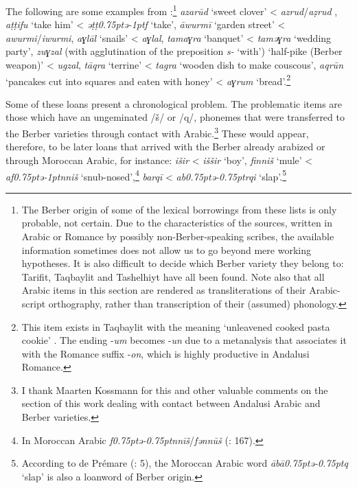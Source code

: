 \documentclass[output=paper,modfonts,nonflat]{langsci/langscibook}
\begin{document}
The following are some examples from \citet{CorrientePereiraVicente2017}:\footnote{The Berber origin of some of the lexical borrowings from these lists is only probable, not certain. Due to the characteristics of the sources, written in Arabic or Romance by possibly non-Berber-speaking scribes, the available information sometimes does not allow us to go beyond mere working hypotheses. It is also difficult to decide which Berber variety they belong to: Tarifit, Taqbaylit and Tashelhiyt have all been found. Note also that all Arabic items in this section are rendered as transliterations of their Arabic-script orthography, rather than transcription of their (assumed) phonology.} \textit{azarūd} ‘sweet clover’ < \textit{azrud}/\textit{aẓrud} , \textit{aṭṭifu} ‘take him’ < \textit{ǝṭṭ\kern 0.75ptǝ\kern -1ptf} ‘take’, \textit{āwurmī} ‘garden street’ < \textit{awurmi}/\textit{iwurmi}, \textit{aɣlāl} ‘snails’ < \textit{aɣlal}, \textit{tamaɣra} ‘banquet’ < \textit{tamǝɣra} `wedding party', \textit{zuɣzal} ({with agglutination of the preposition} \textit{s-} ‘with’) ‘half-pike (Berber weapon)’ < \textit{ugzal}, \textit{tāqra} `terrine' < \textit{tagra} `wooden dish to make couscous’, \textit{aqrūn} ‘pancakes cut into squares and eaten with honey’ < \textit{aɣrum} ‘bread’.\footnote{This item exists in Taqbaylit with the meaning ‘unleavened cooked pasta cookie’ \citep{Dallet1982}. The ending -\textit{um} becomes -\textit{un} due to a metanalysis that associates it with the Romance suffix -\textit{on}, which is highly productive in Andalusi Romance.} 

Some of these loans present a chronological problem. The problematic items are those which have an ungeminated /š/ or /q/, phonemes that were transferred to the Berber varieties through contact with Arabic.\footnote{I thank Maarten Kossmann for this and other valuable comments on the section of this work dealing with contact between Andalusi Arabic and Berber varieties.} These would appear, therefore, to be later loans that arrived with the Berber already arabized or through Moroccan Arabic, for instance: \textit{išir} < \textit{iššir} ‘boy’, \textit{finniš} ‘mule’ < \textit{af\kern 0.75ptǝ\kern -1ptnniš} ‘snub-nosed’,\footnote{In Moroccan Arabic \textit{f\kern 0.75ptǝ\kern -0.75ptnnīš}/\textit{fənnūš} (\citealt{Prémare1998}: 167).}  \textit{barqī} < \textit{ab\kern 0.75ptǝ\kern -0.75ptrqi} ‘slap’.\footnote{According to de Prémare (\citeyear{Prémare1993}: 5), the Moroccan Arabic word \textit{ābā{\R}\kern 0.75ptǝ\kern -0.75ptq} ‘slap’ is also a loanword of Berber origin.}
\end{document}
